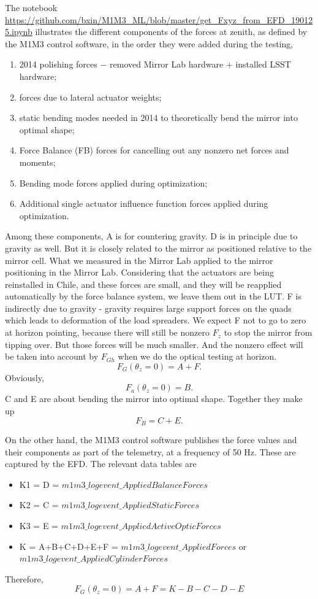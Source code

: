 \documentclass [twoside,openbib,12pt]{article}
\newcommand{\beq}{\begin{equation}}
\newcommand{\eeq}{\end{equation}}
\newcommand{\bitm}{\begin{itemize}}
\newcommand{\eitm}{\end{itemize}}
\newcommand{\bnum}{\begin{enumerate}}
\newcommand{\enum}{\end{enumerate}}
\begin{document}
The notebook
\url{https://github.com/bxin/M1M3_ML/blob/master/get_Fxyz_from_EFD_190125.ipynb}
illustrates the different components of the forces at zenith, as
defined by the M1M3 control software, in the order they were added
during the testing,

\bnum [label=\Alph*]
\item 2014 polishing forces $-$ removed Mirror Lab hardware $+$
  installed LSST hardware;
\item forces due to lateral actuator weights;
  \item static bending modes needed in 2014 to theoretically bend
    the mirror into optimal shape;
    \item Force Balance (FB) forces for cancelling out any nonzero net
      forces and moments;
    \item Bending mode forces applied during optimization;
      \item Additional single actuator influence function forces applied during optimization.
\enum
Among these components, A is for countering gravity.
D is in principle due to gravity as well. But it is closely related
to the mirror as positioned relative to the mirror cell.
What we measured in the Mirror Lab
applied to the mirror positioning in the Mirror Lab. Considering that the
actuators are being reinstalled in Chile, and these forces are small,
and they will be reapplied automatically by the force balance system,
we leave them out in the LUT.
F is indirectly due to gravity - gravity requires large support forces
on the quads which leads to deformation of the load spreaders.
We expect F not to go to zero at horizon pointing, because there will
still be nonzero $F_z$ to stop the mirror from tipping over. But those
forces will be much smaller. And the nonzero effect will be taken into
account by $F_{Gh}$ when we do the optical testing at horizon.
\beq
F_G(\theta_z=0) = A+F.
\eeq
Obviously,
\beq
F_a(\theta_z=0) = B.
\eeq
C and E are about bending the mirror into optimal shape. Together
they make up
\beq
F_B = C+E.
\eeq

On the other hand, the M1M3 control software publishes the force
values and their components as part of the telemetry, at a frequency
of 50 Hz. These are captured by the 
EFD.
The relevant data tables are
\bitm
\item K1 = D = $m1m3\_logevent\_AppliedBalanceForces$
\item K2 = C = $m1m3\_logevent\_AppliedStaticForces$
\item K3 = E = $m1m3\_logevent\_AppliedActiveOpticForces$
\item K = A+B+C+D+E+F = $m1m3\_logevent\_AppliedForces$  or \\$m1m3\_logevent\_AppliedCylinderForces$  
  \eitm
  Therefore,
  \beq
  F_G(\theta_z=0) = A+F = K-B-C-D-E
  \eeq
  
\end{document}
